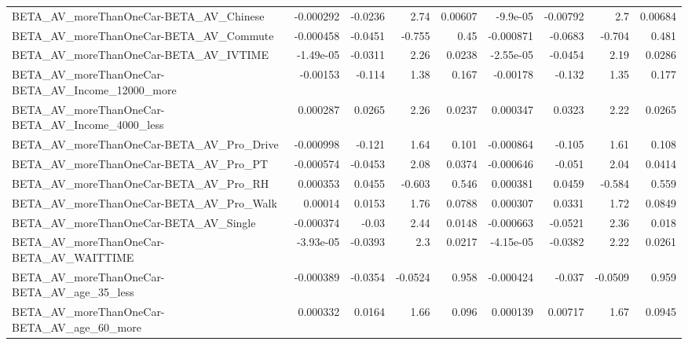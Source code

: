 \begin{tabular}{lrrrrrrrr}
BETA\_AV\_moreThanOneCar-BETA\_AV\_Chinese             &   -0.000292 &      -0.0236 &      2.74 &  0.00607 &   -9.9e-05 &    -0.00792 &          2.7 &       0.00684 \\
BETA\_AV\_moreThanOneCar-BETA\_AV\_Commute             &   -0.000458 &      -0.0451 &    -0.755 &     0.45 &  -0.000871 &     -0.0683 &       -0.704 &         0.481 \\
BETA\_AV\_moreThanOneCar-BETA\_AV\_IVTIME              &   -1.49e-05 &      -0.0311 &      2.26 &   0.0238 &  -2.55e-05 &     -0.0454 &         2.19 &        0.0286 \\
BETA\_AV\_moreThanOneCar-BETA\_AV\_Income\_12000\_more   &    -0.00153 &       -0.114 &      1.38 &    0.167 &   -0.00178 &      -0.132 &         1.35 &         0.177 \\
BETA\_AV\_moreThanOneCar-BETA\_AV\_Income\_4000\_less    &    0.000287 &       0.0265 &      2.26 &   0.0237 &   0.000347 &      0.0323 &         2.22 &        0.0265 \\
BETA\_AV\_moreThanOneCar-BETA\_AV\_Pro\_Drive           &   -0.000998 &       -0.121 &      1.64 &    0.101 &  -0.000864 &      -0.105 &         1.61 &         0.108 \\
BETA\_AV\_moreThanOneCar-BETA\_AV\_Pro\_PT              &   -0.000574 &      -0.0453 &      2.08 &   0.0374 &  -0.000646 &      -0.051 &         2.04 &        0.0414 \\
BETA\_AV\_moreThanOneCar-BETA\_AV\_Pro\_RH              &    0.000353 &       0.0455 &    -0.603 &    0.546 &   0.000381 &      0.0459 &       -0.584 &         0.559 \\
BETA\_AV\_moreThanOneCar-BETA\_AV\_Pro\_Walk            &     0.00014 &       0.0153 &      1.76 &   0.0788 &   0.000307 &      0.0331 &         1.72 &        0.0849 \\
BETA\_AV\_moreThanOneCar-BETA\_AV\_Single              &   -0.000374 &        -0.03 &      2.44 &   0.0148 &  -0.000663 &     -0.0521 &         2.36 &         0.018 \\
BETA\_AV\_moreThanOneCar-BETA\_AV\_WAITTIME            &   -3.93e-05 &      -0.0393 &       2.3 &   0.0217 &  -4.15e-05 &     -0.0382 &         2.22 &        0.0261 \\
BETA\_AV\_moreThanOneCar-BETA\_AV\_age\_35\_less         &   -0.000389 &      -0.0354 &   -0.0524 &    0.958 &  -0.000424 &      -0.037 &      -0.0509 &         0.959 \\
BETA\_AV\_moreThanOneCar-BETA\_AV\_age\_60\_more         &    0.000332 &       0.0164 &      1.66 &    0.096 &   0.000139 &     0.00717 &         1.67 &        0.0945 \\

\end{tabular}
